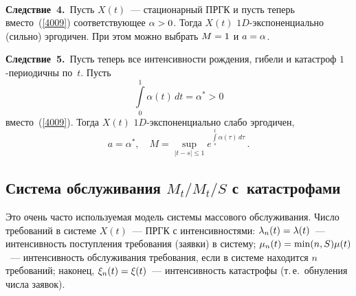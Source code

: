 \begin{multicols}{2}
 \begin{figure*}[b] %
\vspace*{1pt}
 \begin{center}
 \mbox{%
 \epsfxsize=163.445mm
 }
 \end{center}
 \vspace*{-16pt}
\begin{minipage}[t]{80mm}
\end{minipage}
\hfill
\begin{minipage}[t]{80mm}
\end{minipage}
\end{figure*}




\medskip

\noindent
\textbf{Следствие~4.}\
Пусть $X(t)$~--- стационарный ПРГК и пусть теперь вместо~(\ref{4009}) соответствующее
$\alpha \hm> 0$.
Тогда $X(t)$  $1D$-экс\-по\-нен\-ци\-аль\-но (сильно) эргодичен.
При этом можно выбрать $M\hm=1$ и $a\hm = \alpha$.


\medskip

\noindent
\textbf{Следствие~5.}\
Пусть теперь все интенсивности рож\-де\-ния, гибели и катастроф  $1$-пе\-ри\-о\-дич\-ны по~$t$.
Пусть
\begin{equation*}
\int\limits_0^{1}\alpha\left( t\right)\, dt = \alpha^* > 0
\end{equation*}
вместо~(\ref{4009}). Тогда  $X(t)$  $1D$-экс\-по\-нен\-ци\-аль\-но слабо эргодичен,
\begin{equation*}
a= \alpha^*, \quad M = \sup\limits_{|t-s|\le 1} e^{\int\limits_s^{t}\alpha\left( \tau\right)\, d\tau}\,.
\end{equation*}


\vspace*{-9pt}

\subsection{Система обслуживания  $M_t/M_t/S$ с~катастрофами}

Это  очень часто используемая модель системы массового обслуживания.
Число требований в сис\-те\-ме $X(t)$~--- ПРГК
с интенсивностями: $\lambda_n(t)\hm=  \lambda(t)$~---
интенсивность поступления требования (заявки) в сис\-те\-му;
$\mu_n(t)\hm=\min(n,S)\mu(t)$~--- интенсивность обслуживания требования,
если в сис\-те\-ме находится $n$ требований;
наконец,  $\xi_n(t)\hm=\xi(t)$~--- интенсивность катастрофы (т.\,е.\ обнуления числа заявок).


\end{multicols}
